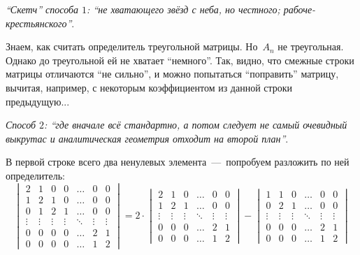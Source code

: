\documentclass[a4paper,12pt]{article}
\theoremstyle{remark}
\begin{document}
  \begin{solution}
    \leavevmode
    
    \emph{``Скетч'' способа $1$: ``не хватающего звёзд с неба, но честного; рабоче-крестьянского''}.
    
    Знаем, как считать определитель треугольной матрицы.
    Но~$A_n$ не треугольная.
    Однако до треугольной ей не хватает ``немного''.
    Так, видно, что смежные строки матрицы отличаются ``не сильно'', и можно попытаться ``поправить'' матрицу, вычитая, например, с некоторым коэффициентом из данной строки предыдущую...
    
    \medskip
    
    \emph{Способ $2$: ``где вначале всё стандартно, а потом следует не самый очевидный выкрутас и аналитическая геометрия отходит на второй план''}.
    
    В первой строке всего два ненулевых элемента~---~попробуем разложить по ней определитель:
    \[
      \begin{vmatrix}
        2      & 1      & 0      & 0      & \ldots & 0      & 0\\
        1      & 2      & 1      & 0      & \ldots & 0      & 0\\
        0      & 1      & 2      & 1      & \ldots & 0      & 0\\
        \vdots & \vdots & \vdots & \vdots & \ddots & \vdots & \vdots\\
        0      & 0      & 0      & 0      & \ldots & 2      & 1\\
        0      & 0      & 0      & 0      & \ldots & 1      & 2
      \end{vmatrix}
      = 2 \cdot \begin{vmatrix}
        2      & 1      & 0      & \ldots & 0      & 0\\
        1      & 2      & 1      & \ldots & 0      & 0\\
        \vdots & \vdots & \vdots & \ddots & \vdots & \vdots\\
        0      & 0      & 0      & \ldots & 2      & 1\\
        0      & 0      & 0      & \ldots & 1      & 2
      \end{vmatrix} - \begin{vmatrix}
        1      & 1      & 0      & \ldots & 0      & 0\\
        0      & 2      & 1      & \ldots & 0      & 0\\
        \vdots & \vdots & \vdots & \ddots & \vdots & \vdots\\
        0      & 0      & 0      & \ldots & 2      & 1\\
        0      & 0      & 0      & \ldots & 1      & 2
      \end{vmatrix}
    \]
    

\end{solution}
\end{document}
